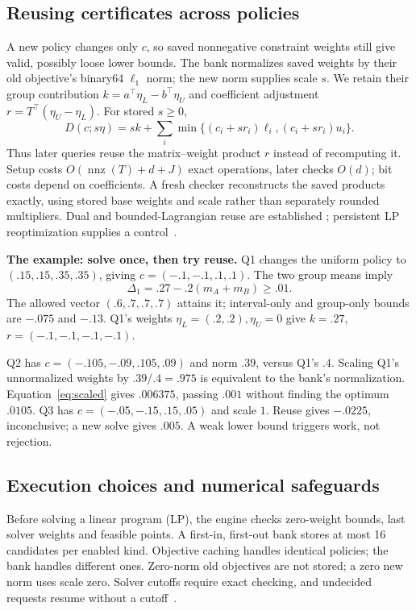 \documentclass[conference]{IEEEtran}
\begin{document}
\subsection{Reusing certificates across policies}\label{sec:reuse}
A new policy changes only $c$, so saved nonnegative constraint weights still give valid, possibly loose lower bounds. The bank normalizes saved weights by their old objective's binary64 $\ell_1$ norm; the new norm supplies scale $s$. We retain their group contribution $k=a^\top\eta_L-b^\top\eta_U$ and coefficient adjustment $r=T^\top(\eta_U-\eta_L)$. For stored $s\ge0$,
\begin{equation}
 D(c;s\eta)=sk+\sum_i\min\{(c_i+sr_i)\ell_i,(c_i+sr_i)u_i\}.
 \label{eq:scaled}
\end{equation}
Thus later queries reuse the matrix--weight product $r$ instead of recomputing it. Setup costs $O(\operatorname{nnz}(T)+d+J)$ exact operations, later checks $O(d)$; bit costs depend on coefficients. A fresh checker reconstructs the saved products exactly, using stored base weights and scale rather than separately rounded multipliers.
Dual and bounded-Lagrangian reuse are established
\cite{Marcucci2021WarmStart,Kothari2026BendersReuse,Deza2026MIPSensitivity};
persistent LP reoptimization supplies a control~\cite{HiGHSHotStart2026}.

\textbf{The example: solve once, then try reuse.} Q1 changes the uniform policy to $(.15,.15,.35,.35)$, giving $c=(-.1,-.1,.1,.1)$. The two group means imply
\[\Delta_1=.27-.2(m_A+m_B)\ge .01.\]
The allowed vector $(.6,.7,.7,.7)$ attains it; interval-only and group-only bounds are $-.075$ and $-.13$. Q1's weights $\eta_L=(.2,.2),\eta_U=0$ give $k=.27$, $r=(-.1,-.1,-.1,-.1)$.

Q2 has $c=(-.105,-.09,.105,.09)$ and norm $.39$, versus Q1's $.4$. Scaling Q1's unnormalized weights by $.39/.4=.975$ is equivalent to the bank's normalization. Equation~\eqref{eq:scaled} gives $.006375$, passing $.001$ without finding the optimum $.0105$. Q3 has $c=(-.05,-.15,.15,.05)$ and scale $1$. Reuse gives $-.0225$, inconclusive; a new solve gives $.005$. A weak lower bound triggers work, not rejection.

\subsection{Execution choices and numerical safeguards}
\label{sec:threshold}\label{sec:scheduling}
Before solving a linear program (LP), the engine checks zero-weight bounds, last solver weights and feasible points. A first-in, first-out bank stores at most 16 candidates per enabled kind. Objective caching handles identical policies; the bank handles different ones. Zero-norm old objectives are not stored; a zero new norm uses scale zero. Solver cutoffs require exact checking, and undecided requests resume without a cutoff~\cite{HiGHSOptions2026}.
\end{document}
